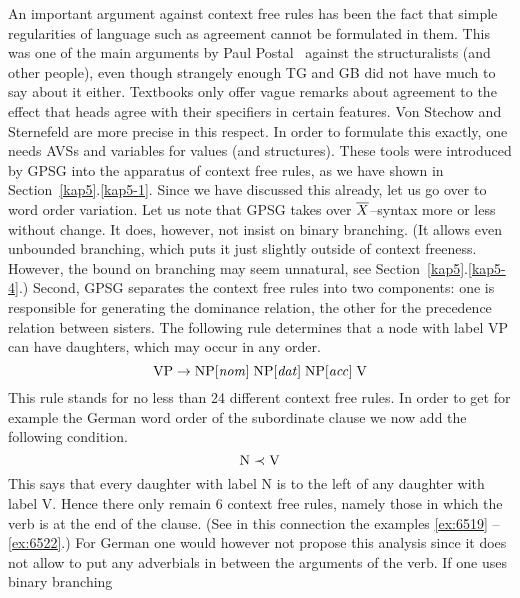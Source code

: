 An important argument against context free rules has been the fact
that simple regularities of language such as agreement cannot be
formulated in them. This was one of the main arguments by Paul
Postal~  
against the structuralists 
(and other people), even though strangely enough TG and GB did not 
have much to say about it either. Textbooks only offer vague 
remarks about agreement to the effect that heads agree with their 
specifiers in certain features. Von Stechow 
and Sternefeld  are more
precise in this respect. In order to formulate this exactly, one
needs AVSs and variables for values (and structures). These tools
were introduced by GPSG into the apparatus of context free rules,
as we have shown in Section~\ref{kap5}.\ref{kap5-1}. Since we have discussed 
this already, let us go over to word order variation. Let us note
that GPSG takes over $\overline{X}$--syntax more or less without
change. It does, however, not insist on binary branching. (It 
allows even unbounded branching, which puts it just slightly 
outside of context freeness. However, the bound on branching 
may seem unnatural, see Section~\ref{kap5}.\ref{kap5-4}.) Second,
GPSG separates the context free rules into two components: one is
responsible for generating the dominance relation, the other for
the precedence relation between sisters. The following rule
determines that a node with label {\rm VP} can have daughters,
which may occur in any order.
\begin{equation}
\mbox{\rm VP} \rightarrow
\mbox{\rm NP}[\mbox{\it nom\/}]\;
\mbox{\rm NP}[\mbox{\it dat\/}]\;
\mbox{\rm NP}[\mbox{\it acc\/}]\;
\mbox{\rm V}
\end{equation}
This rule stands for no less than 24 different context free rules.
In order to get for example the German 
word order of the subordinate clause we now add the following condition.
\begin{equation}
\mbox{\rm N} \prec \mbox{\rm V}
\end{equation}
This says that every daughter with label {\rm N} is to the left of
any daughter with label {\rm V}. Hence there only remain 6 context
free rules, namely those in which the verb is at the end of the
clause. (See in this connection the examples \eqref{ex:6519} --
\eqref{ex:6522}.) For German one would however not propose this
analysis since it does not allow to put any adverbials in
between the arguments of the verb. If one uses binary branching 

